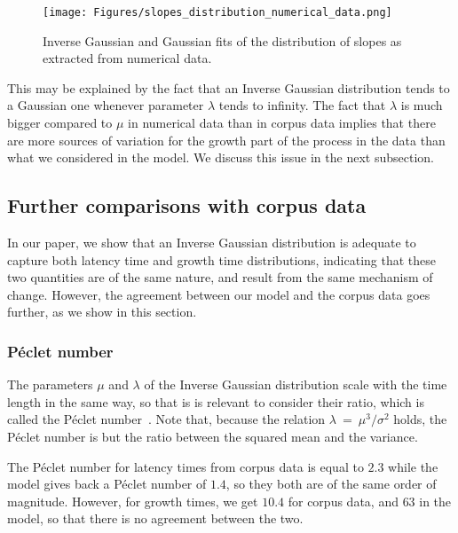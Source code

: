 \documentclass[12pt,twocolumn,amsmath,amssymb,aps,longbibliography]{revtex4-1}  %
\begin{document}
\begin{figure*}[!tp]
  \centering
  \texttt{[image: Figures/slopes\_distribution\_numerical\_data.png]}
  \caption{Inverse Gaussian and Gaussian fits of the distribution of slopes as extracted from numerical data.}
  \label{fig:slopes_numerical_distrib}
\end{figure*}

This may be explained by the fact that an Inverse Gaussian distribution tends to a Gaussian one whenever parameter $\lambda$ tends to infinity. The fact that $\lambda$ is much bigger compared to $\mu$ in numerical data than in corpus data implies that there are more sources of variation for the growth part of the process in the data than what we considered in the model. We discuss this issue in the next subsection.

\subsection{Further comparisons with corpus data \label{A5}}

In our paper, we show that an Inverse Gaussian distribution is adequate to capture both latency time and growth time distributions, indicating that these two quantities are of the same nature, and result from the same mechanism of change. However, the agreement between our model and the corpus data goes further, as we show in this section. 

\subsubsection{P\'eclet number}

The parameters $\mu$ and $\lambda$ of the Inverse Gaussian distribution scale with the time length in the same way, so that is is relevant to consider their ratio, which is called the P\'eclet number~\cite{redner2001guide}. Note that, because the relation $\lambda~=~\mu^3/\sigma^2$ holds, the P\'eclet number is but the ratio between the squared mean and the variance. 

The P\'eclet number for latency times from corpus data is equal to $2.3$ while the model gives back a P\'eclet number of $1.4$, so they both are of the same order of magnitude. However, for growth times, we get $10.4$ for corpus data, and $63$ in the model, so that there is no agreement between the two.
\end{document}
